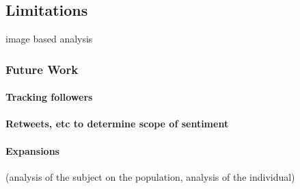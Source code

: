 \documentclass{acm_proc_article-sp}
\begin{document}
	\subsection{Limitations}
	image based analysis
		\subsubsection{Future Work}
			\paragraph{Tracking followers}
			\paragraph{Retweets, etc to determine scope of sentiment}
			\paragraph{Expansions}
			(analysis of the subject on the population, analysis of the individual)


\end{document}
